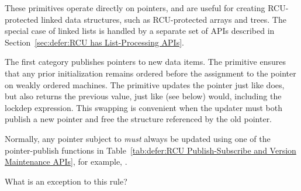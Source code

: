 These primitives operate directly on pointers, and are useful for
creating RCU-protected linked data structures, such as RCU-protected
arrays and trees.
The special case of linked lists is handled by a separate set of
APIs described in
Section~\ref{sec:defer:RCU has List-Processing APIs}.

The first category publishes pointers to new data items. 
The  primitive ensures that any
prior initialization remains ordered before the assignment to the
pointer on weakly ordered machines.
The  primitive updates the pointer just like
 does, but also returns the previous value,
just like  (see below) would, including
the lockdep expression.
This swapping is convenient when the updater must both publish a new
pointer and free the structure referenced by the old pointer.

\QuickQuiz{}
	Normally, any pointer subject to  \emph{must}
	always be updated using one of the pointer-publish functions in
	Table~\ref{tab:defer:RCU Publish-Subscribe and Version Maintenance APIs},
	for example, .

	What is an exception to this rule?
 \QuickQuizEnd


